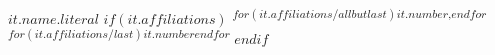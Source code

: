 $it.name.literal$ %
$if(it.affiliations)$%
\textsuperscript{%
$for(it.affiliations/allbutlast)$$it.number$,$endfor$%
$for(it.affiliations/last)$$it.number$$endfor$%
}%
$endif$